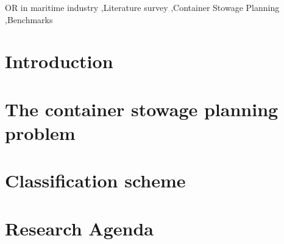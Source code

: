 \documentclass[preprint,12pt,authoryear]{elsarticle}
\begin{document}
\begin{frontmatter}
\begin{highlights}
\end{highlights}

\begin{keyword}
OR in maritime industry \sep Literature survey \sep Container Stowage Planning \sep Benchmarks
\end{keyword}

\end{frontmatter}



\section{Introduction}
\label{sec:introduction}


\section{The container stowage planning problem}
\label{sec:stowagePlanning}


\section{Classification scheme}
\label{sec:literatureSurvey}


%

\section{Research Agenda}
\label{sec:mathModels}

\end{document}
